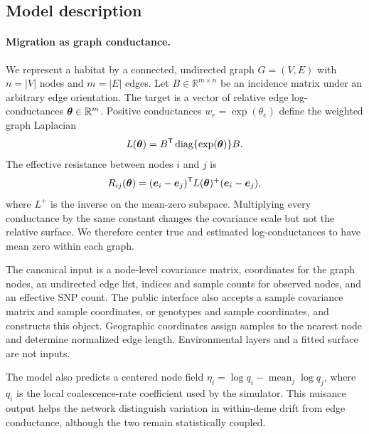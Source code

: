 \subsection{Model description}

\paragraph{Migration as graph conductance.}
We represent a habitat by a connected, undirected graph $G=(V,E)$ with
$n=|V|$ nodes and $m=|E|$ edges. Let
$B\in\mathbb{R}^{m\times n}$ be an incidence matrix under an arbitrary edge
orientation. The target is a vector of relative edge log-conductances
$\boldsymbol{\theta}\in\mathbb{R}^m$. Positive conductances
$w_e=\exp(\theta_e)$ define the weighted graph Laplacian
\begin{equation}
    L(\boldsymbol{\theta})
    =B^\mathsf{T}\operatorname{diag}\{\exp(\boldsymbol{\theta})\}B.
    \label{eq:weighted-laplacian}
\end{equation}
The effective resistance between nodes $i$ and $j$ is
\begin{equation}
    R_{ij}(\boldsymbol{\theta})
    =
    (\boldsymbol{e}_i-\boldsymbol{e}_j)^\mathsf{T}
    L(\boldsymbol{\theta})^+
    (\boldsymbol{e}_i-\boldsymbol{e}_j),
    \label{eq:effective-resistance}
\end{equation}
where $L^+$ is the inverse on the mean-zero subspace. Multiplying every
conductance by the same constant changes the covariance scale but not the
relative surface. We therefore center true and estimated log-conductances to
have mean zero within each graph.

The canonical input is a node-level covariance matrix, coordinates for the
graph nodes, an undirected edge list, indices and sample counts for observed
nodes, and an effective SNP count. The public interface also accepts a sample
covariance matrix and sample coordinates, or genotypes and sample coordinates,
and constructs this object. Geographic coordinates assign samples to the
nearest node and determine normalized edge length. Environmental layers and a
fitted \feems surface are not inputs.

The model also predicts a centered node field
$\eta_i=\log q_i-\operatorname{mean}_j\log q_j$, where $q_i$ is the local
coalescence-rate coefficient used by the simulator. This nuisance output helps
the network distinguish variation in within-deme drift from edge conductance,
although the two remain statistically coupled.

